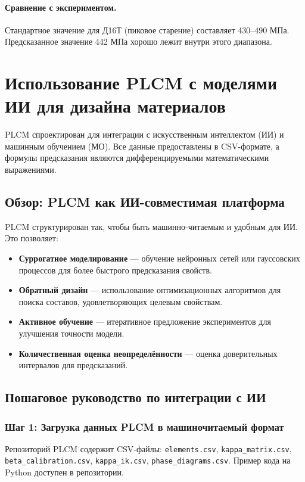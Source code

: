 \documentclass[12pt,a4paper]{article}
\begin{document}
	\paragraph{Сравнение с экспериментом.}
	Стандартное значение для Д16Т (пиковое старение) составляет 430–490 МПа. Предсказанное значение 442 МПа хорошо лежит внутри этого диапазона.
	
	\section{Использование PLCM с моделями ИИ для дизайна материалов}
	\label{sec:ai-integration}
	
	PLCM спроектирован для интеграции с искусственным интеллектом (ИИ) и машинным обучением (МО). Все данные предоставлены в CSV-формате, а формулы предсказания являются дифференцируемыми математическими выражениями.
	
	\subsection{Обзор: PLCM как ИИ-совместимая платформа}
	
	PLCM структурирован так, чтобы быть машинно-читаемым и удобным для ИИ. Это позволяет:
	\begin{itemize}
		\item \textbf{Суррогатное моделирование} — обучение нейронных сетей или гауссовских процессов для более быстрого предсказания свойств.
		\item \textbf{Обратный дизайн} — использование оптимизационных алгоритмов для поиска составов, удовлетворяющих целевым свойствам.
		\item \textbf{Активное обучение} — итеративное предложение экспериментов для улучшения точности модели.
		\item \textbf{Количественная оценка неопределённости} — оценка доверительных интервалов для предсказаний.
	\end{itemize}
	
	\subsection{Пошаговое руководство по интеграции с ИИ}
	
	\subsubsection{Шаг 1: Загрузка данных PLCM в машиночитаемый формат}
	Репозиторий PLCM содержит CSV-файлы: \texttt{elements.csv}, \texttt{kappa\_matrix.csv}, \texttt{beta\_calibration.csv}, \texttt{kappa\_ik.csv}, \texttt{phase\_diagrams.csv}. Пример кода на Python доступен в репозитории.
	
\end{document}
